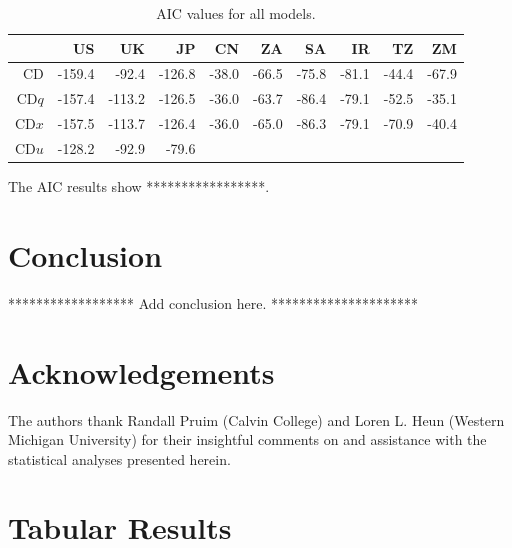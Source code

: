 \documentclass[preprint,authoryear,12pt]{elsarticle}\usepackage{graphicx, color}
\begin{document}
\begin{table}[ht]
\begin{center}
\caption{AIC values for all models.}
\label{tab:AICTable}
\begin{tabular}{rrrrrrrrrr}
  \hline
 & US & UK & JP & CN & ZA & SA & IR & TZ & ZM \\ 
  \hline
CD & -159.4 & -92.4 & -126.8 & -38.0 & -66.5 & -75.8 & -81.1 & -44.4 & -67.9 \\ 
  CD$q$ & -157.4 & -113.2 & -126.5 & -36.0 & -63.7 & -86.4 & -79.1 & -52.5 & -35.1 \\ 
  CD$x$ & -157.5 & -113.7 & -126.4 & -36.0 & -65.0 & -86.3 & -79.1 & -70.9 & -40.4 \\ 
  CD$u$ & -128.2 & -92.9 & -79.6 &  &  &  &  &  &  \\ 
   \hline
\end{tabular}
\end{center}
\end{table}



The AIC results show *****************.

\section{Conclusion}

****************** Add conclusion here. *********************

\section{Acknowledgements}

The authors thank Randall Pruim (Calvin College) and Loren L. Heun (Western Michigan University) for their insightful comments on and assistance with the statistical analyses presented herein.


\appendix
\section{Tabular Results}
\end{document}
